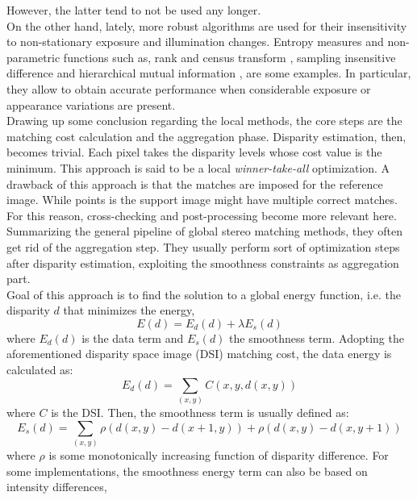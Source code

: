 However, the latter tend to not be used any longer. \\
On the other hand, lately, more robust algorithms are used for their insensitivity to non-stationary exposure and illumination changes. 
Entropy measures and non-parametric functions such as, rank and census transform \citep{Zabih1994}, sampling insensitive difference\citep{Birchfield1999} and hierarchical mutual information \citep{Hirschmuller2008}, are some examples.
In particular, they allow to obtain accurate performance when considerable exposure or appearance variations are present. \\
Drawing up some conclusion regarding the local methods, the core steps are the matching cost calculation and the aggregation phase. 
Disparity estimation, then, becomes trivial. Each pixel takes the disparity levels whose cost value is the minimum. 
This approach is said to be a local \textit{winner-take-all} optimization. 
A drawback of this approach is that the matches are imposed for the reference image. 
While points is the support image might have multiple correct matches. 
For this reason, cross-checking and post-processing become more relevant here.\\
Summarizing the general pipeline of global stereo matching methods, they often get rid of the aggregation step. 
They usually perform sort of optimization steps after disparity estimation, exploiting the smoothness constraints as aggregation part. \\
Goal of this approach is to find the solution to a global energy function, i.e. the disparity $d$ that minimizes the energy,
\begin{equation}\label{eqn:energyfct}
	E(d) = E_d(d) + \lambda E_s(d)
\end{equation}
where $E_d(d)$ is the data term and $E_s(d)$ the smoothness term.
Adopting the aforementioned disparity space image (DSI) matching cost, the data energy is calculated as:
\begin{equation}\label{dataterm}
	E_d(d) = \sum_{(x,y)} C(x, y, d(x, y))
\end{equation}
where $C$ is the DSI.
Then, the smoothness term is usually defined as:
\begin{equation}\label{smoothterm}
	E_s(d) = \sum_{(x,y)} \rho (d(x,y) - d(x + 1, y)) + \rho (d(x,y) - d(x, y + 1))
\end{equation}
where $\rho$ is some monotonically increasing function of disparity difference. 
For some implementations, the smoothness energy term can also be based on intensity differences,
